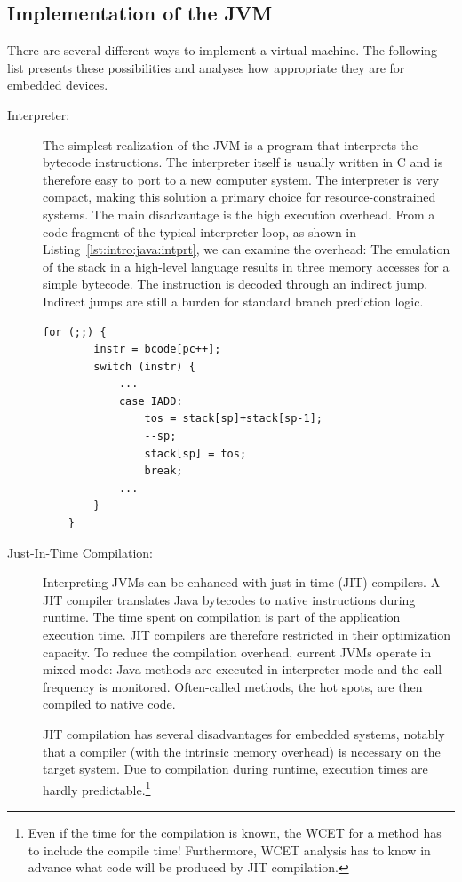 \subsection{Implementation of the JVM}

There are several different ways to implement a virtual machine. The
following list presents these possibilities and analyses how
appropriate they are for embedded devices.
%
\begin{description}
    \item[Interpreter:]
The simplest realization of the JVM is a program that interprets the
bytecode instructions. The interpreter itself is usually written in
C and is therefore easy to port to a new computer system. The
interpreter is very compact, making this solution a primary choice
for resource-constrained systems. The main disadvantage is the high
execution overhead. From a code fragment of the typical interpreter
loop, as shown in Listing~\ref{lst:intro:java:intprt}, we can
examine the overhead: The emulation of the stack in a high-level
language results in three memory accesses for a simple 
bytecode. The instruction is decoded through an indirect jump.
Indirect jumps are still a burden for standard branch prediction
logic.

\begin{lstlisting}[float,caption={Typical JVM interpreter loop},
label=lst:intro:java:intprt]
    for (;;) {
        instr = bcode[pc++];
        switch (instr) {
            ...
            case IADD:
                tos = stack[sp]+stack[sp-1];
                --sp;
                stack[sp] = tos;
                break;
            ...
        }
    }
\end{lstlisting}

    \item[Just-In-Time Compilation:]
Interpreting JVMs can be enhanced with just-in-time (JIT) compilers.
A JIT compiler translates Java bytecodes to native instructions
during runtime. The time spent on compilation is part of the
application execution time. JIT compilers are therefore restricted
in their optimization capacity. To reduce the compilation overhead,
current JVMs operate in mixed mode: Java methods are executed in
interpreter mode and the call frequency is monitored. Often-called
methods, the hot spots, are then compiled to native code.

JIT compilation has several disadvantages for embedded systems,
notably that a compiler (with the intrinsic memory overhead) is
necessary on the target system. Due to compilation during
runtime, execution times are hardly predictable.\footnote{Even if
the time for the compilation is known, the WCET for a method has
to include the compile time! Furthermore, WCET analysis has to
know in advance what code will be produced by JIT compilation.}


\end{description}
